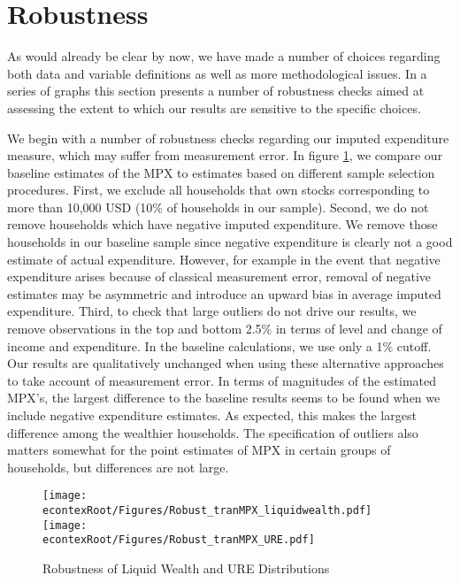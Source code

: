 \documentclass[titlepage]{\econtex}\newcommand{\texname}{ConsumptionHeterogeneity}
\begin{document}
\section{Robustness} \label{robustness}
As would already be clear by now, we have made a number of choices regarding both data and variable definitions as well as more methodological issues. In a series of graphs this section presents a number of robustness checks aimed at assessing the extent to which our results are sensitive to the specific choices. 

We begin with a number of robustness checks regarding our imputed expenditure measure, which may suffer from measurement error. In figure \ref{fig:Robust_liquidURE}, we compare our baseline estimates of the MPX to estimates based on different sample selection procedures. First, we exclude all households that own stocks corresponding to more than 10,000 USD (10\% of households in our sample). Second, we do not remove households which have negative imputed expenditure. We remove those households in our baseline sample since negative expenditure is clearly not a good estimate of actual expenditure. However, for example in the event that negative expenditure arises because of classical measurement error, removal of negative estimates may be asymmetric and introduce an upward bias in average imputed expenditure. Third, to check that large outliers do not drive our results, we remove observations in the top and bottom 2.5\% in terms of level and change of income and expenditure. In the baseline calculations, we use only a 1\% cutoff. Our results are qualitatively unchanged when using these alternative approaches to take account of measurement error. In terms of magnitudes of the estimated MPX's, the largest difference to the baseline results seems to be found when we include negative expenditure estimates. As expected, this makes the largest difference among the wealthier households. The specification of outliers also matters somewhat for the point estimates of MPX in certain groups of households, but differences are not large. 

\begin{figure}
    \begin{centering}
 		\texttt{[image: \\econtexRoot/Figures/Robust\_tranMPX\_liquidwealth.pdf]}
		\texttt{[image: \\econtexRoot/Figures/Robust\_tranMPX\_URE.pdf]}
		\caption{Robustness of Liquid Wealth and URE Distributions}
		\label{fig:Robust_liquidURE}
	\end{centering}
\end{figure}
\end{document}
